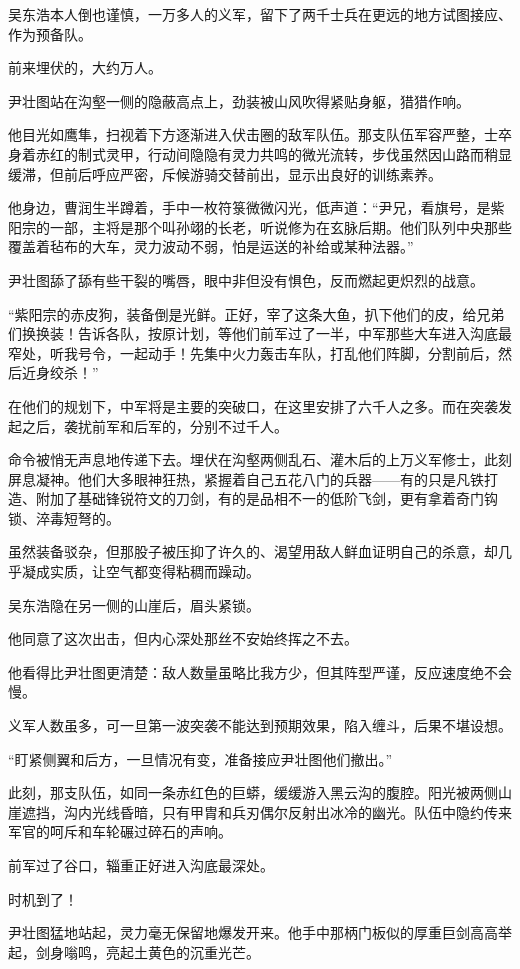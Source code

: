 吴东浩本人倒也谨慎，一万多人的义军，留下了两千士兵在更远的地方试图接应、作为预备队。

前来埋伏的，大约万人。

尹壮图站在沟壑一侧的隐蔽高点上，劲装被山风吹得紧贴身躯，猎猎作响。

他目光如鹰隼，扫视着下方逐渐进入伏击圈的敌军队伍。那支队伍军容严整，士卒身着赤红的制式灵甲，行动间隐隐有灵力共鸣的微光流转，步伐虽然因山路而稍显缓滞，但前后呼应严密，斥候游骑交替前出，显示出良好的训练素养。

他身边，曹润生半蹲着，手中一枚符箓微微闪光，低声道：“尹兄，看旗号，是紫阳宗的一部，主将是那个叫孙翊的长老，听说修为在玄脉后期。他们队列中央那些覆盖着毡布的大车，灵力波动不弱，怕是运送的补给或某种法器。”

尹壮图舔了舔有些干裂的嘴唇，眼中非但没有惧色，反而燃起更炽烈的战意。

“紫阳宗的赤皮狗，装备倒是光鲜。正好，宰了这条大鱼，扒下他们的皮，给兄弟们换换装！告诉各队，按原计划，等他们前军过了一半，中军那些大车进入沟底最窄处，听我号令，一起动手！先集中火力轰击车队，打乱他们阵脚，分割前后，然后近身绞杀！”

在他们的规划下，中军将是主要的突破口，在这里安排了六千人之多。而在突袭发起之后，袭扰前军和后军的，分别不过千人。

命令被悄无声息地传递下去。埋伏在沟壑两侧乱石、灌木后的上万义军修士，此刻屏息凝神。他们大多眼神狂热，紧握着自己五花八门的兵器——有的只是凡铁打造、附加了基础锋锐符文的刀剑，有的是品相不一的低阶飞剑，更有拿着奇门钩锁、淬毒短弩的。

虽然装备驳杂，但那股子被压抑了许久的、渴望用敌人鲜血证明自己的杀意，却几乎凝成实质，让空气都变得粘稠而躁动。

吴东浩隐在另一侧的山崖后，眉头紧锁。

他同意了这次出击，但内心深处那丝不安始终挥之不去。

他看得比尹壮图更清楚：敌人数量虽略比我方少，但其阵型严谨，反应速度绝不会慢。

义军人数虽多，可一旦第一波突袭不能达到预期效果，陷入缠斗，后果不堪设想。

“盯紧侧翼和后方，一旦情况有变，准备接应尹壮图他们撤出。”

此刻，那支队伍，如同一条赤红色的巨蟒，缓缓游入黑云沟的腹腔。阳光被两侧山崖遮挡，沟内光线昏暗，只有甲胄和兵刃偶尔反射出冰冷的幽光。队伍中隐约传来军官的呵斥和车轮碾过碎石的声响。

前军过了谷口，辎重正好进入沟底最深处。

时机到了！

尹壮图猛地站起，灵力毫无保留地爆发开来。他手中那柄门板似的厚重巨剑高高举起，剑身嗡鸣，亮起土黄色的沉重光芒。

